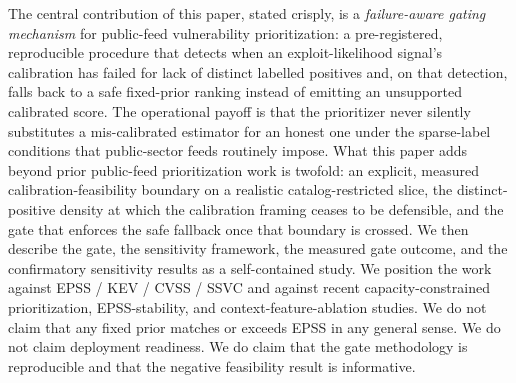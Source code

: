The central contribution of this paper, stated crisply, is a \emph{failure-aware gating mechanism} for public-feed vulnerability prioritization: a pre-registered, reproducible procedure that detects when an exploit-likelihood signal's calibration has failed for lack of distinct labelled positives and, on that detection, falls back to a safe fixed-prior ranking instead of emitting an unsupported calibrated score. The operational payoff is that the prioritizer never silently substitutes a mis-calibrated estimator for an honest one under the sparse-label conditions that public-sector feeds routinely impose. What this paper adds beyond prior public-feed prioritization work is twofold: an explicit, measured calibration-feasibility boundary on a realistic catalog-restricted slice, the distinct-positive density at which the calibration framing ceases to be defensible, and the gate that enforces the safe fallback once that boundary is crossed. We then describe the gate, the sensitivity framework, the measured gate outcome, and the confirmatory sensitivity results as a self-contained study. We position the work against EPSS / KEV / CVSS / SSVC and against recent capacity-constrained prioritization, EPSS-stability, and context-feature-ablation studies. We do not claim that any fixed prior matches or exceeds EPSS in any general sense. We do not claim deployment readiness. We do claim that the gate methodology is reproducible and that the negative feasibility result is informative.
